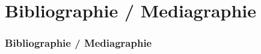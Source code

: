 \documentclass[slidetop,11pt]{beamer}
\begin{document}
\def\sectionPartBibliographie{Bibliographie / Mediagraphie}
\section{\sectionPartBibliographie}
\begin{frame}
	\frametitle{\sectionPartBibliographie}
	{\footnotesize 
		\nocite{*}
		
		
	}
\end{frame}
\end{document}

